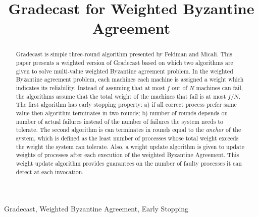 \documentclass[conference]{IEEEtran}
\begin{document}
\title{Gradecast for Weighted Byzantine Agreement\\
}

\author{
\and
{}
}

\maketitle

\begin{abstract}
Gradecast is simple three-round algorithm presented by Feldman and Micali. This paper presents a weighted version of Gradecast based on which two algorithms are given to solve multi-value weighted Byzantine agreement problem. In the weighted Byzantine agreement problem, each machines each machine is assigned a weight which indicates its reliability. Instead of assuming that at most $f$ out of $N$ machines can fail, the algorithms assume that the total
weight of the machines that fail is at most $f/N$. The first algorithm has early stopping property: a) if all correct process prefer same value then algorithm terminates in two rounds; b) number of rounds depends on number of actual failures instead of the number of failures the system needs to tolerate. The second algorithm is can terminates in rounds equal to the \textit{anchor} of the system, which is defined as the least number of processes whose total weight exceeds the weight the system can tolerate. Also, a weight update algorithm is given to update weights of processes after each execution of the weighted Byzantine Agreement. This weight update algorithm provides guarantees on the number of faulty processes it can detect at each invocation. 
\end{abstract}

\begin{IEEEkeywords}
Gradecast, Weighted Byzantine Agreement, Early Stopping
\end{IEEEkeywords}
\end{document}
